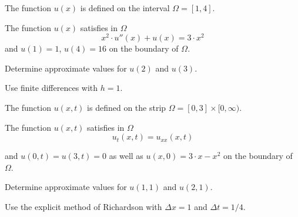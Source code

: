 \begin{teilaufgaben}
\item
The function $u(x)$ is defined on the interval $\Omega = [1,4].$ 

The function $u(x)$ satisfies in $\Omega$ 
\[
x^2 \cdot u''(x) + u(x) = 3 \cdot x^2
\]
and  $u(1) = 1$, $u(4) = 16$ on the boundary of $\Omega$. 

Determine approximate values for $u(2)$ and $u(3)$. 

Use finite differences with $h = 1$. 
\item
The function $u(x,t)$ is defined on the strip
$\Omega = [0, 3] \times [0,\infty)$.

The function $u(x,t)$ satisfies in $\Omega$
\[
u_{t}(x,t) = u_{xx}(x,t)
\]

and $u(0,t) = u(3,t) = 0$ as well as $u(x,0) = 3 \cdot x - x^2$
on the boundary of $\Omega$.

Determine approximate values for $u(1,1)$ and $u(2,1)$. 

Use the explicit method of Richardson with $\Delta x = 1$ and $\Delta t = 1/4.$
\end{teilaufgaben}

